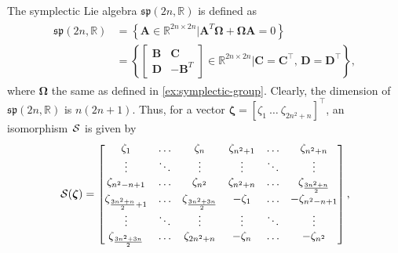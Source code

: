 \begin{example}
    The symplectic Lie algebra $\mathfrak{sp}(2n, \mathbb{R})$ is defined as
    \begin{align*}
        \begin{split}
            \mathfrak{sp}(2n, \mathbb{R}) &= \left\{ \mathbf{A} \in \mathbb{R}^{2n\times 2n} | \mathbf{A}^T\boldsymbol{\Omega} + \boldsymbol{\Omega}\mathbf{A} = 0 \right\} \\&= \left\{ \begin{bmatrix} \mathbf{B} & \mathbf{C} \\ \mathbf{D} & -\mathbf{B}^T \end{bmatrix}\in \mathbb{R}^{2n\times 2n}| \mathbf{C} = \mathbf{C}^\top,\, \mathbf{D} = \mathbf{D}^\top\right\},            
        \end{split}
    \end{align*}
    where $\boldsymbol{\Omega}$ the same as defined in \autoref{ex:symplectic-group}. Clearly, the dimension of $\mathfrak{sp}(2n, \mathbb{R})$ is $n(2n + 1)$. Thus,
    for a vector $\boldsymbol{\zeta} = [\zeta_1\ \dots\ \zeta_{2n^2+n}]^\top$, an isomorphism $\SL$ is given by
    \begin{align*}
        \SL[\boldsymbol{\zeta}] = \begin{bmatrix}
            \zeta_1 & \dots & \zeta_n & \zeta_{n^2 + 1} & \dots & \zeta_{n^2 + n} \\
            \vdots & \ddots & \vdots & \vdots & \ddots & \vdots \\
            \zeta_{n^2 - n + 1} & \dots & \zeta_{n^2} & \zeta_{n^2 + n} & \dots & \zeta_{\frac{3n^2+n}{2}}\\
            \zeta_{\frac{3n^2+n}{2} + 1} & \dots & \zeta_{\frac{3n^2+3n}{2}} & -\zeta_1 & \dots & -\zeta_{n^2 - n + 1}\\
            \vdots & \ddots & \vdots & \vdots & \ddots & \vdots\\
            \zeta_{\frac{3n^2+3n}{2}} & \dots & \zeta_{2n^2 + n}& -\zeta_n & \dots & -\zeta_{n^2} 
        \end{bmatrix},
    \end{align*}
\end{example}
